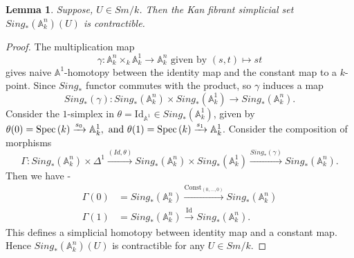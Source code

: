 \documentclass[11pt, reqno]{amsart}
\theoremstyle{plain}
\newtheorem{lemma}[thm]{Lemma}
\theoremstyle{definition}
\newcommand{\Spec}{{\rm Spec \,}}
\newcommand{\A}{{\mathbb A}}
\begin{document}
\begin{lemma} \cite[Section 2.3, Corollary 3.5]{mv} \label{contractible An}
    Suppose, $U\in Sm/k$. Then the Kan fibrant simplicial set $Sing_*(\mathbb{A}^n_k)(U)$ is contractible.
\end{lemma}
\begin{proof}
    The multiplication map 
    $$\gamma: \mathbb{A}^n_k \times_k \mathbb{A}^1_k \to \mathbb{A}^n_k \text{ given by } (s,t) \mapsto st$$
    gives naive $\mathbb{A}^1$-homotopy between the identity map and the constant map to a $k$-point. Since $Sing_*$ functor commutes with the product, so $\gamma$ induces a map
    $$Sing_*(\gamma): Sing_*(\mathbb{A}^n_k) \times Sing_*(\mathbb{A}^1_k) \to Sing_*(\mathbb{A}^n_k).$$
    Consider the $1$-simplex in $\theta= \mathrm{Id}_{\A^1}\in Sing_*(\A^1_k)$, given by $\theta(0)=\Spec(k)\xrightarrow{s_0}\A^1_k,\mathrm{\ and \ } \theta(1)=\Spec(k)\xrightarrow{s_1}\A^1_k$.
    Consider the composition of morphisms
    $$\Gamma: Sing_*(\mathbb{A}^n_k) \times \Delta^1 \xrightarrow{(Id, \theta)} Sing_*(\mathbb{A}^n_k) \times Sing_*(\mathbb{A}^1_k) \xrightarrow{Sing_*(\gamma)} Sing_*(\mathbb{A}^n_k).$$ 
    Then we have -
    \begin{align*}
    	\Gamma(0) &= Sing_*(\A^n_k)\xrightarrow{\mathrm{Const}_{(0,\dots,0)}} Sing_*(\A^n_k)\\
    	\Gamma(1) &= Sing_*(\A^n_k) \xrightarrow{\mathrm{Id}} Sing_*(\A^n_k).
    \end{align*}
     This defines a simplicial homotopy between identity map and a constant map. Hence $Sing_*(\A^n_k)(U)$ is contractible for any $U\in Sm/k$.
\end{proof}
\end{document}

